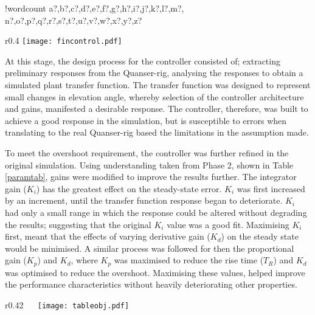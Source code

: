 \documentclass[11pt]{article}
\newcounter{words}
\newenvironment{counted}{%
  \setcounter{words}{0}
  \SearchList!{wordcount}{\stepcounter{words}}
    {a?,b?,c?,d?,e?,f?,g?,h?,i?,j?,k?,l?,m?,
    n?,o?,p?,q?,r?,s?,t?,u?,v?,w?,x?,y?,z?}
  \UndoBoundary{'}
  \SearchOrder{p;}}{%
  \StopSearching}
\begin{document}
\begin{counted}
\begin{wrapfigure}{r}{0.4\textwidth}
 \vspace{-25pt}
 \centering
  \texttt{[image: fincontrol.pdf]}
\vspace{-10pt}
  \caption{Showing Improved Controller Architecture}
  \vspace{-20pt}
  \label{fincontrol}
 \end{wrapfigure}

At this stage, the design process for the controller consisted of;
extracting preliminary responses from the Quanser-rig, analysing the
responses to obtain a simulated plant transfer function. The transfer
function was designed to represent small changes in elevation angle,
whereby selection of the controller architecture and gains, manifested a
desirable response. The controller, therefore, was built to achieve a
good response in the simulation, but is susceptible to errors when
translating to the real Quanser-rig based the limitations in the
assumption made.

To meet the overshoot requirement, the controller was further refined in
the original simulation. Using understanding taken from Phase 2, shown
in Table \ref{paramtab}, gains were modified to improve the results
further. The integrator gain (\(K_i\)) has the greatest effect on the
steady-state error. \(K_i\) was first increased by an increment, until
the transfer function response began to deteriorate. \(K_i\) had only a
small range in which the response could be altered without degrading the
results; suggesting that the original \(K_i\) value was a good fit.
Maximising \(K_i\) first, meant that the effects of varying derivative
gain (\(K_d\)) on the steady state would be minimised. A similar process
was followed for then the proportional gain (\(K_p\)) and \(K_d\), where
\(K_p\) was maximised to reduce the rise time (\(T_R\)) and \(K_d\) was
optimised to reduce the overshoot. Maximising these values, helped
improve the performance characteristics without heavily deteriorating
other properties.

\begin{wrapfigure}{r}{0.42\textwidth}
 \vspace{-35pt}
\centering
{}
\vspace{-2pt}
 \texttt{[image: tableobj.pdf]}
 \vspace{-35pt}
 \label{paramtab}
 \end{wrapfigure}


\end{counted}
\end{document}
